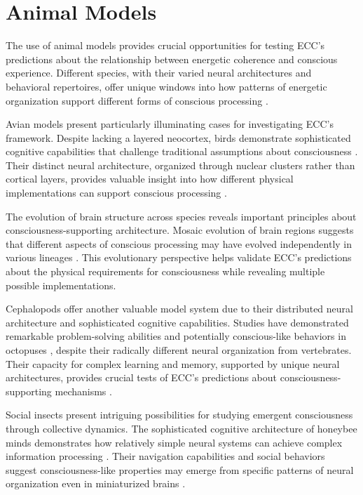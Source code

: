 \section{Animal Models}

The use of animal models provides crucial opportunities for testing ECC's predictions about the relationship between energetic coherence and conscious experience. Different species, with their varied neural architectures and behavioral repertoires, offer unique windows into how patterns of energetic organization support different forms of conscious processing \cite{Boly2013}.

Avian models present particularly illuminating cases for investigating ECC's framework. Despite lacking a layered neocortex, birds demonstrate sophisticated cognitive capabilities that challenge traditional assumptions about consciousness \cite{Gunturkun2016}. Their distinct neural architecture, organized through nuclear clusters rather than cortical layers, provides valuable insight into how different physical implementations can support conscious processing \cite{Clayton2015}.

The evolution of brain structure across species reveals important principles about consciousness-supporting architecture. Mosaic evolution of brain regions suggests that different aspects of conscious processing may have evolved independently in various lineages \cite{Barton2000}. This evolutionary perspective helps validate ECC's predictions about the physical requirements for consciousness while revealing multiple possible implementations.

Cephalopods offer another valuable model system due to their distributed neural architecture and sophisticated cognitive capabilities. Studies have demonstrated remarkable problem-solving abilities and potentially conscious-like behaviors in octopuses \cite{Mather2008}, despite their radically different neural organization from vertebrates. Their capacity for complex learning and memory, supported by unique neural architectures, provides crucial tests of ECC's predictions about consciousness-supporting mechanisms \cite{Teyke1989}.

Social insects present intriguing possibilities for studying emergent consciousness through collective dynamics. The sophisticated cognitive architecture of honeybee minds demonstrates how relatively simple neural systems can achieve complex information processing \cite{Menzel2001}. Their navigation capabilities and social behaviors suggest consciousness-like properties may emerge from specific patterns of neural organization even in miniaturized brains \cite{Webb2016}.

